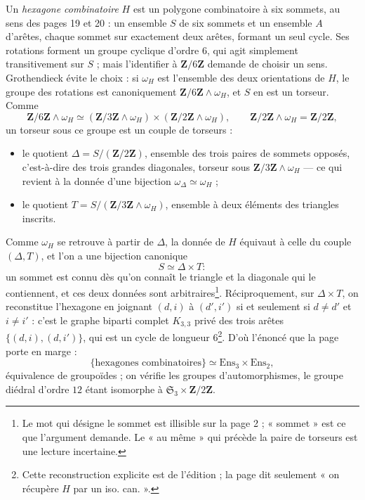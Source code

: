 \documentclass[11pt,a4paper]{article}
\begin{document}
Un \emph{hexagone combinatoire} $H$ est un polygone combinatoire à six sommets,
au sens des pages 19 et 20 : un ensemble $S$ de six sommets et un ensemble $A$
d'arêtes, chaque sommet sur exactement deux arêtes, formant un seul cycle. Ses
rotations forment un groupe cyclique d'ordre $6$, qui agit simplement
transitivement sur $S$ ; mais l'identifier à $\mathbf{Z}/6\mathbf{Z}$ demande de
choisir un sens. Grothendieck évite le choix : si $\omega_H$ est l'ensemble des
deux orientations de $H$, le groupe des rotations est canoniquement
$\mathbf{Z}/6\mathbf{Z} \wedge \omega_H$, et $S$ en est un torseur. Comme
\[
\mathbf{Z}/6\mathbf{Z} \wedge \omega_H \simeq (\mathbf{Z}/3\mathbf{Z} \wedge \omega_H) \times
(\mathbf{Z}/2\mathbf{Z} \wedge \omega_H), \qquad \mathbf{Z}/2\mathbf{Z} \wedge \omega_H = \mathbf{Z}/2\mathbf{Z},
\]
un torseur sous ce groupe est un couple de torseurs :
\begin{itemize}
  \item le quotient $\Delta = S/(\mathbf{Z}/2\mathbf{Z})$, ensemble des trois paires de
    sommets opposés, c'est-à-dire des trois grandes diagonales, torseur sous
    $\mathbf{Z}/3\mathbf{Z} \wedge \omega_H$ — ce qui revient à la donnée d'une
    bijection $\omega_\Delta \simeq \omega_H$ ;
  \item le quotient $T = S/(\mathbf{Z}/3\mathbf{Z} \wedge \omega_H)$, ensemble à deux
    éléments des triangles inscrits.
\end{itemize}
Comme $\omega_H$ se retrouve à partir de $\Delta$, la donnée de $H$ équivaut à
celle du couple $(\Delta, T)$, et l'on a une bijection canonique
\[
S \simeq \Delta \times T :
\]
un sommet est connu dès qu'on connaît le triangle et la diagonale qui le
contiennent, et ces deux données sont arbitraires\footnote{Le mot qui désigne
le sommet est illisible sur la page 2 ; « sommet » est ce que l'argument
demande. Le « au même » qui précède la paire de torseurs est une lecture
incertaine.}. Réciproquement, sur $\Delta \times T$, on reconstitue l'hexagone en
joignant $(d, i)$ à $(d', i')$ si et seulement si $d \neq d'$ et $i \neq i'$ :
c'est le graphe biparti complet $K_{3,3}$ privé des trois arêtes $\{(d, i), (d,
i')\}$, qui est un cycle de longueur $6$\footnote{Cette reconstruction explicite
est de l'édition ; la page dit seulement « on récupère $H$ par un iso.
can. ».}. D'où l'énoncé que la page porte en marge :
\[
\{\text{hexagones combinatoires}\} \simeq \mathrm{Ens}_3 \times \mathrm{Ens}_2 ,
\]
équivalence de groupoïdes ; on vérifie les groupes d'automorphismes, le groupe
diédral d'ordre $12$ étant isomorphe à $\mathfrak{S}_3 \times \mathbf{Z}/2\mathbf{Z}$.
\end{document}
